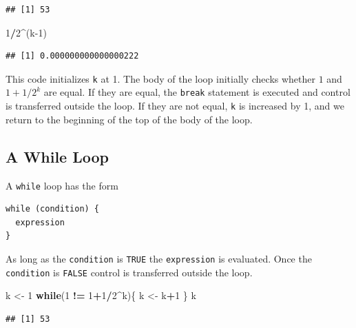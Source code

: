 \documentclass[
]{krantz}
\newenvironment{Shaded}{\begin{snugshade}}{\end{snugshade}}
\newcommand{\ControlFlowTok}[1]{\textcolor[rgb]{0.13,0.29,0.53}{\textbf{#1}}}
\newcommand{\DecValTok}[1]{\textcolor[rgb]{0.00,0.00,0.81}{#1}}
\newcommand{\NormalTok}[1]{#1}
\newcommand{\OperatorTok}[1]{\textcolor[rgb]{0.81,0.36,0.00}{\textbf{#1}}}
\newcommand{\StringTok}[1]{\textcolor[rgb]{0.31,0.60,0.02}{#1}}
\begin{document}
\begin{verbatim}
## [1] 53
\end{verbatim}

\begin{Shaded}
\begin{Highlighting}[]
\DecValTok{1}\OperatorTok{/}\DecValTok{2}\OperatorTok{\^{}}\NormalTok{(k}\DecValTok{{-}1}\NormalTok{)}
\end{Highlighting}
\end{Shaded}

\begin{verbatim}
## [1] 0.000000000000000222
\end{verbatim}

This code initializes \texttt{k} at 1. The body of the loop initially checks whether \(1\) and \(1+1/2^k\) are equal. If they are equal, the \texttt{break} statement is executed and control is transferred outside the loop. If they are not equal, \texttt{k} is increased by 1, and we return to the beginning of the top of the body of the loop.

\hypertarget{a-while-loop}{%
\subsection{A While Loop}\label{a-while-loop}}

A \texttt{while} loop has the form

\begin{verbatim}
while (condition) {
  expression
}
\end{verbatim}

As long as the \texttt{condition} is \texttt{TRUE} the \texttt{expression} is evaluated. Once the \texttt{condition} is \texttt{FALSE} control is transferred outside the loop.

\begin{Shaded}
\begin{Highlighting}[]
\NormalTok{k \textless{}{-}}\StringTok{ }\DecValTok{1}
\ControlFlowTok{while}\NormalTok{(}\DecValTok{1} \OperatorTok{!=}\StringTok{ }\DecValTok{1}\OperatorTok{+}\DecValTok{1}\OperatorTok{/}\DecValTok{2}\OperatorTok{\^{}}\NormalTok{k)\{}
\NormalTok{    k \textless{}{-}}\StringTok{ }\NormalTok{k}\OperatorTok{+}\DecValTok{1} 
\NormalTok{\}}
\NormalTok{k}
\end{Highlighting}
\end{Shaded}

\begin{verbatim}
## [1] 53
\end{verbatim}
\end{document}
